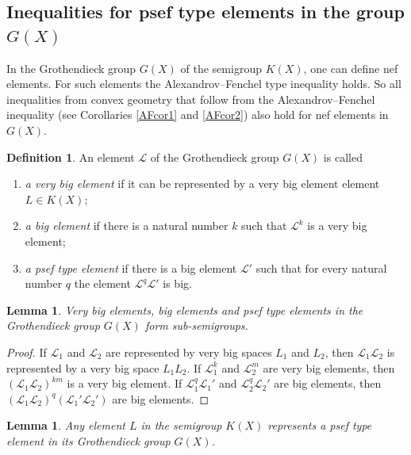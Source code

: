 \documentclass[11pt]{article}
\theoremstyle{plain}
\newtheorem{lemma}[theorem]{Lemma}
\theoremstyle{definition}
\newtheorem{definition}[theorem]{Definition}
\begin{document}
\subsection{Inequalities for psef  type elements in the group   $G(X)$}


In the Grothendieck group $G(X)$ of the semigroup  $K(X)$, one can define nef elements. For such elements the Alexandrov--Fenchel type inequality holds. So all inequalities from convex  geometry that follow from the Alexandrov--Fenchel inequality (see Corollaries \ref{AFcor1} and \ref{AFcor2}) also hold for nef elements in $G(X)$.

\begin{definition} An element $\mathcal L$ of the Grothendieck group  $G(X)$ is called
\begin{enumerate}
\item   {\it a very big element} if it can be represented by a  very big element element $L\in K(X)$;
\item {\it a big element} if there is a natural number $k$ such that $\mathcal L^k$ is a very big element;

\item   {\it a  psef type element} if there is a   big element  $\mathcal L'$ such that  for every natural number $q$ the element $\mathcal L^q\mathcal L'$ is  big.
    \end{enumerate}
    \end{definition}



\begin{lemma} Very big elements, big elements and psef type elements  in the Grothendieck  group $G(X)$ form  sub-semigroups.
\end{lemma}

\begin{proof} If $\mathcal L_1$ and $ \mathcal L_2$ are represented by very big spaces $L_1$ and $L_2$, then $\mathcal L_1 \mathcal L_2$ is represented by a very big space $L_1 L_2$.
If $\mathcal L_1^k$ and $\mathcal L_2^m$ are very big elements, then $(\mathcal L_1 \mathcal L_2)^{km}$ is a very big element. If $\mathcal L^q_1  \mathcal L_1'$ and $\mathcal L_2^q \mathcal L_2'$ are big elements, then $(\mathcal L_1 \mathcal L_2)^q (\mathcal L_1' \mathcal L_2')$ are big elements.
\end{proof}

 \begin{lemma} Any element $L$ in  the semigroup $K(X)$ represents a psef type element in its Grothendieck group $G(X)$.
 \end{lemma}
\end{document}
